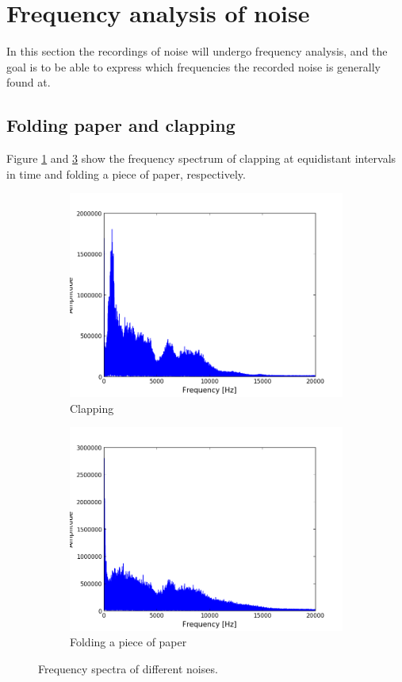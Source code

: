 \section{Frequency analysis of noise}
In this section the recordings of noise will undergo frequency analysis, and the goal is to be able to express which frequencies the recorded noise is generally found at.
\subsection{Folding paper and clapping}
Figure \ref{fig:clapping} and \ref{fig:folding} show the frequency spectrum of clapping at equidistant intervals in time and folding a piece of paper, respectively.
\begin{figure}[H]
\centering
\begin{subfigure}{0.49\textwidth}
\centering
\includegraphics[width=\textwidth]{figures/freqanal/clapping.png}
\caption{Clapping}
\label{fig:clapping}
\end{subfigure}
\begin{subfigure}{0.49\textwidth}
\centering
\includegraphics[width=\textwidth]{figures/freqanal/folding.png}
\caption{Folding a piece of paper}
\label{fig:folding}
\end{subfigure}
\caption{Frequency spectra of different noises.}
\end{figure}
